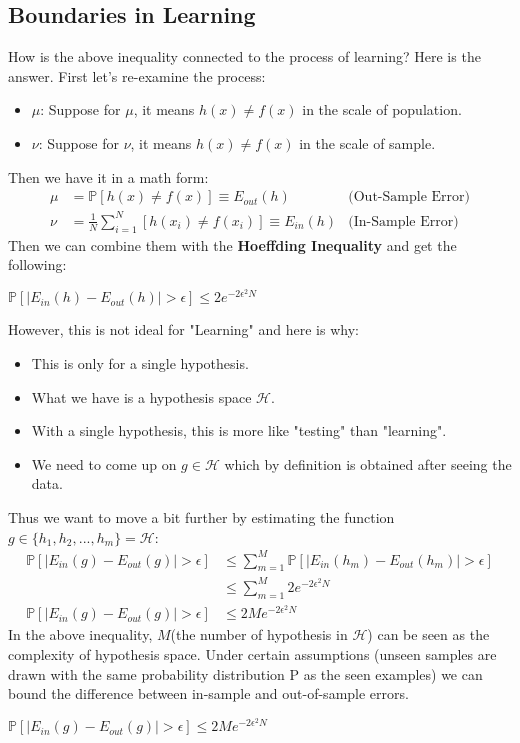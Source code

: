 \documentclass{article}
\begin{document}
\subsection{Boundaries in Learning}
How is the above inequality connected to the process of learning? Here is the answer. First let's re-examine the process:
\begin{itemize}
    \item $\mu$: Suppose for $\mu$, it means $h(x) \neq f(x)$ in the scale of population.
    \item $\nu$: Suppose for $\nu$, it means $h(x) \neq f(x)$ in the scale of sample.
\end{itemize}
Then we have it in a math form: 
\begin{align*}
    \mu &= \mathbb{P}[h(x) \neq f(x)] \equiv E_{out}(h) & \text{(Out-Sample Error)}\\
    \nu &= \frac{1}{N}\sum_{i=1}^{N}[h(x_{i}) \neq f(x_{i})] \equiv E_{in}(h) & \text{(In-Sample Error)}
\end{align*}
Then we can combine them with the \textbf{Hoeffding Inequality} and get the following:
\begin{tcolorbox}[colback=yellow!20, colframe=yellow!90, title=Expanded Hoeffding Inequality 1, coltitle=black]
$\mathbb{P}[\mid E_{in}(h) - E_{out}(h) \mid > \epsilon] \leq 2e^{-2\epsilon^{2}N}$
\end{tcolorbox}
However, this is not ideal for "Learning" and here is why:
\begin{itemize}
    \item This is only for a single hypothesis.
    \item What we have is a hypothesis space $\mathcal{H}$.
    \item With a single hypothesis, this is more like "testing" than "learning".
    \item We need to come up on $g \in \mathcal{H}$ which by definition is obtained after seeing the data.
\end{itemize}
Thus we want to move a bit further by estimating the function $g \in \{ h_{1}, h_{2}, ..., h_{m}\} = \mathcal{H}$:
\begin{align*}
    \mathbb{P}[\mid E_{in}(g) - E_{out}(g) \mid > \epsilon] & \leq \sum_{m=1}^{M} \mathbb{P}[\mid E_{in}(h_{m}) - E_{out}(h_{m}) \mid > \epsilon]\\
    & \leq \sum_{m=1}^{M}2e^{-2\epsilon^{2}N}\\
    \mathbb{P}[\mid E_{in}(g) - E_{out}(g) \mid > \epsilon] & \leq 2Me^{-2\epsilon^{2}N}
\end{align*}
In the above inequality, $M$(the number of hypothesis in $\mathcal{H}$) can be seen as the complexity of hypothesis space. Under certain assumptions (unseen samples are drawn with the same probability distribution P as the seen examples) we can bound the difference between in-sample and out-of-sample errors.
\begin{tcolorbox}[colback=yellow!20, colframe=yellow!90, title=Expanded Hoeffding Inequality 2, coltitle=black]
$\mathbb{P}[\mid E_{in}(g) - E_{out}(g) \mid > \epsilon] \leq 2Me^{-2\epsilon^{2}N}$
\end{tcolorbox}
\end{document}
